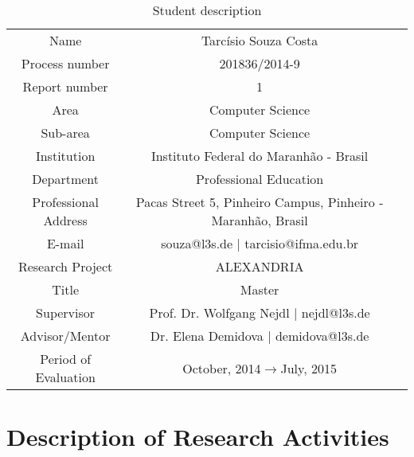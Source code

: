\documentclass[a4paper,11pt]{report}
\begin{document}
\begin{table} [!htb]
\begin{center}
\begin{tabular}{|l|l|l}
\cline{1-2}
\multicolumn{1}{|c|}{Name} & \multicolumn{1}{c|}{Tarcísio Souza Costa} &  \\ 
\cline{1-2}
\multicolumn{1}{|c|}{Process number} & \multicolumn{1}{c|}{201836/2014-9} &  \\ 
\cline{1-2}
\multicolumn{1}{|c|}{Report number} & \multicolumn{1}{c|}{1} &  \\
\cline{1-2}
\multicolumn{1}{|c|}{Area} & \multicolumn{1}{c|}{Computer Science} &  \\ 
\cline{1-2}
\multicolumn{1}{|c|}{Sub-area} & \multicolumn{1}{c|}{Computer Science} &  \\ 
\cline{1-2}
\multicolumn{1}{|c|}{Institution} & \multicolumn{1}{c|}{Instituto Federal do
Maranhão - Brasil} & \\
\cline{1-2}
\multicolumn{1}{|c|}{Department} & \multicolumn{1}{c|}{Professional Education} &\\
\cline{1-2}
\multicolumn{1}{|c|}{Professional Address} & \multicolumn{1}{c|}{
Pacas Street 5, Pinheiro Campus, Pinheiro - Maranhão, Brasil} &
\\
\cline{1-2}
\multicolumn{1}{|c|}{E-mail} &
\multicolumn{1}{c|}{souza@l3s.de | tarcisio@ifma.edu.br} &\\
\cline{1-2}
\multicolumn{1}{|c|}{Research Project} &
\multicolumn{1}{c|}{ALEXANDRIA}
&
\\
\cline{1-2}
\multicolumn{1}{|c|}{Title} & \multicolumn{1}{|c|}{Master} \\
\cline{1-2}
\multicolumn{1}{|c|}{Supervisor} & \multicolumn{1}{|c|}{Prof. Dr. Wolfgang
Nejdl | nejdl@l3s.de} \\
\cline{1-2}
\multicolumn{1}{|c|}{Advisor/Mentor} & \multicolumn{1}{|c|}{Dr. Elena Demidova
| demidova@l3s.de}

\\
\cline{1-2}
\multicolumn{1}{|c|}{Period of Evaluation} &
 \multicolumn{1}{c|}{October, 2014$\rightarrow$July, 2015} \\
\cline{1-2}
\end{tabular}

\caption{Student description}
\end{center}
\label{tab:work}
\end{table}



\chapter{Description of Research Activities}
\end{document}
